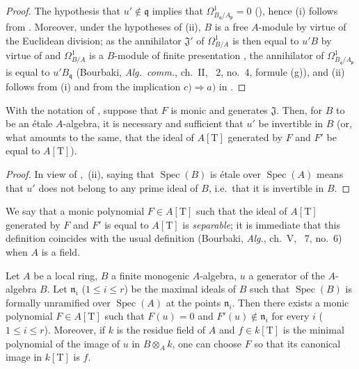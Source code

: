 \begin{proof}
The hypothesis that $u'\notin\mathfrak{q}$ implies that $\Omega^1_{B_\mathfrak{q}/A_\mathfrak{p}}=0$ (), hence (i) follows from .
Moreover, under the hypotheses of (ii), $B$ is a free $A$-module by virtue of the Euclidean division;
as the annihilator $\mathfrak{J}'$ of $\Omega^1_{B/A}$ is then equal to $u'B$ by virtue of  and $\Omega^1_{B/A}$ is a $B$-module of finite presentation , the annihilator of $\Omega^1_{B_\mathfrak{q}/A_\mathfrak{p}}$ is equal to $u'B_\mathfrak{q}$ (Bourbaki, \emph{Alg.\ comm.}, ch.~II, \textsection~2, no.~4, formule (g)), and (ii) follows from (i) and from the implication $c)\Rightarrow a)$ in .
\end{proof}

\begin{corollary}[18.4.3]
\label{IV.18.4.3}
With the notation of , suppose that $F$ is monic and generates $\mathfrak{J}$.
Then, for $B$ to be an \'etale $A$-algebra, it is necessary and sufficient that $u'$ be invertible in $B$ (or, what amounts to the same, that the ideal of $A[\mathrm{T}]$ generated by $F$ and $F'$ be equal to $A[\mathrm{T}]$).
\end{corollary}

\begin{proof}
In view of ,~(ii), saying that $\operatorname{Spec}(B)$ is \'etale over $\operatorname{Spec}(A)$ means that $u'$ does not belong to any prime ideal of $B$, i.e.\ that it is invertible in $B$.
\end{proof}

We say that a monic polynomial $F\in A[\mathrm{T}]$ such that the ideal of $A[\mathrm{T}]$ generated by $F$ and $F'$ is equal to $A[\mathrm{T}]$ is \emph{separable};
it is immediate that this definition coincides with the usual definition (Bourbaki, \emph{Alg.}, ch.~V, \textsection~7, no.~6) when $A$ is a field.

\begin{lemma}[18.4.4]
\label{IV.18.4.4}
Let $A$ be a local ring, $B$ a finite monogenic $A$-algebra, $u$ a generator of the $A$-algebra $B$.
Let $\mathfrak{n}_i$ ($1\leq i\leq r$) be the maximal ideals of $B$ such that $\operatorname{Spec}(B)$ is formally unramified over $\operatorname{Spec}(A)$ at the points $\mathfrak{n}_i$.
Then there exists a monic polynomial $F\in A[\mathrm{T}]$ such that $F(u)=0$ and $F'(u)\notin\mathfrak{n}_i$ for every $i$ ($1\leq i\leq r$).
Moreover, if $k$ is the
residue field of $A$ and $f\in k[\mathrm{T}]$ is the minimal polynomial of the image of $u$ in $B\otimes_A k$, one can choose $F$ so that its canonical image in $k[\mathrm{T}]$ is $f$.
\end{lemma}

